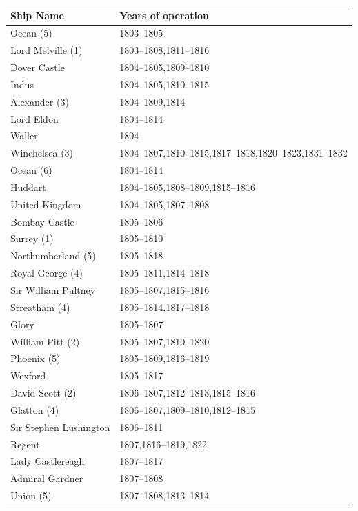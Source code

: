\documentclass[CP]{copernicus}
\begin{document}
\begin{table}[!hbp]
\begin{minipage}[b]{0.5\linewidth}\centering
{\scriptsize
\begin{tabular}{|p{3.5cm}|p{3.5cm}|}
\hline 
{\bf Ship Name} & {\bf Years of operation} \\ 
\hline
Ocean (5) & 1803--1805\\
\hline
Lord Melville (1) & 1803--1808,1811--1816\\
\hline
Dover Castle & 1804--1805,1809--1810\\
\hline
Indus & 1804--1805,1810--1815\\
\hline
Alexander (3) & 1804--1809,1814\\
\hline
Lord Eldon & 1804--1814\\
\hline
Waller & 1804\\
\hline
Winchelsea (3) & 1804--1807,1810--1815,1817--1818,1820--1823,1831--1832\\
\hline
Ocean (6) & 1804--1814\\
\hline
Huddart & 1804--1805,1808--1809,1815--1816\\
\hline
United Kingdom & 1804--1805,1807--1808\\
\hline
Bombay Castle & 1805--1806\\
\hline
Surrey (1) & 1805--1810\\
\hline
Northumberland (5) & 1805--1818\\
\hline
Royal George (4) & 1805--1811,1814--1818\\
\hline
Sir William Pultney & 1805--1807,1815--1816\\
\hline
Streatham (4) & 1805--1814,1817--1818\\
\hline
Glory & 1805--1807\\
\hline
William Pitt (2) & 1805--1807,1810--1820\\
\hline
Phoenix (5) & 1805--1809,1816--1819\\
\hline
Wexford & 1805--1817\\
\hline
David Scott (2) & 1806--1807,1812--1813,1815--1816\\
\hline
Glatton (4) & 1806--1807,1809--1810,1812--1815\\
\hline
Sir Stephen Lushington & 1806--1811\\
\hline
Regent & 1807,1816--1819,1822\\
\hline
Lady Castlereagh & 1807--1817\\
\hline
Admiral Gardner & 1807--1808\\
\hline
Union (5) & 1807--1808,1813--1814\\

\end{tabular}}
\end{minipage}
\end{table}
\end{document}
